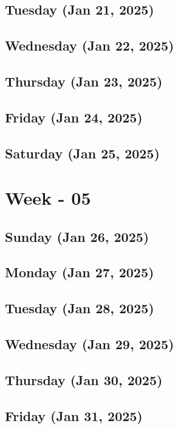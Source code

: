 \subsection*{Tuesday (Jan 21, 2025)}
\subsection*{Wednesday (Jan 22, 2025)}
\subsection*{Thursday (Jan 23, 2025)}
\subsection*{Friday (Jan 24, 2025)}
\subsection*{Saturday (Jan 25, 2025)}

\section{Week - 05}
\subsection*{Sunday (Jan 26, 2025)}
\subsection*{Monday (Jan 27, 2025)}
\subsection*{Tuesday (Jan 28, 2025)}
\subsection*{Wednesday (Jan 29, 2025)}
\subsection*{Thursday (Jan 30, 2025)}
\subsection*{Friday (Jan 31, 2025)}


\newpage
\begin{spacing}{1.0}
\renewcommand{\bibname}{\bf{References}}


\end{spacing}
